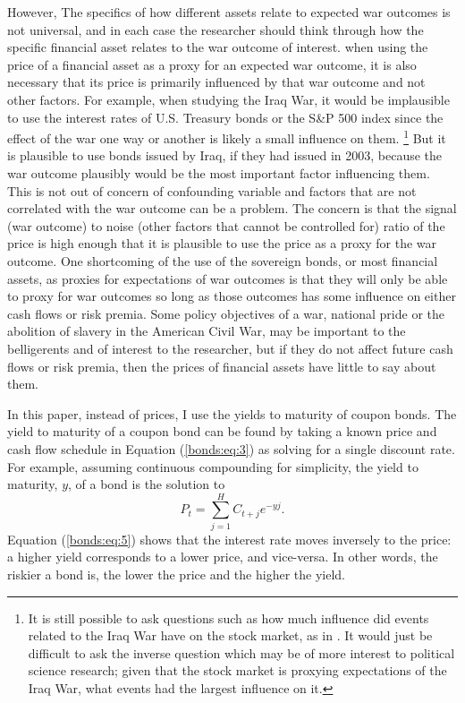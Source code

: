 However, The specifics of how different assets relate to expected war outcomes is not universal, and in each case the researcher should think through how the specific financial asset relates to the war outcome of interest.%
when using the price of a financial asset as a proxy for an expected war outcome, it is also necessary that its price is primarily influenced by that war outcome and not other factors.
For example, when studying the Iraq War, it would be implausible to use the interest rates of U.S. Treasury bonds or the S\&P 500 index since the effect of the war one way or another is likely a small influence on them.%
\footnote{
  It is still possible to ask questions such as how much influence did events related to the Iraq War have on the stock market, as in .
  It would just be difficult to ask the inverse question which may be of more interest to political science research; given that the stock market is proxying expectations of the Iraq War, what events had the largest influence on it.
 }
But it is plausible to use bonds issued by Iraq, if they had issued in 2003, because the war outcome plausibly would be the most important factor influencing them.
This is not out of concern of confounding variable and factors that are not correlated with the war outcome can be a problem.
The concern is that the signal (war outcome) to noise (other factors that cannot be controlled for) ratio of the price is high enough that it is plausible to use the price as a proxy for the war outcome.
One shortcoming of the use of the sovereign bonds, or most financial assets, as proxies for expectations of war outcomes is that they will only be able to proxy for war outcomes so long as those outcomes has some influence on either cash flows or risk premia.
Some policy objectives of a war, \eg{}national pride or the abolition of slavery in the American Civil War, may be important to the belligerents and of interest to the researcher, but if they do not affect future cash flows or risk premia, then the prices of financial assets have little to say about them.

In this paper, instead of prices, I use the yields to maturity of coupon bonds.
The yield to maturity of a coupon bond can be found by taking a known price and cash flow schedule in Equation (\ref{bonds:eq:3}) as solving for a single discount rate.
For example, assuming continuous compounding for simplicity, the yield to maturity, $y$, of a bond is the solution to
\begin{equation}
  \label{bonds:eq:5}
  P_{t} = \sum_{j = 1}^{H} C_{t + j} e^{-y j} \text{.}
\end{equation}
Equation (\ref{bonds:eq:5}) shows that the interest rate moves inversely to the price: a higher yield corresponds to a lower price, and vice-versa.
In other words, the riskier a bond is, the lower the price and the higher the yield.




